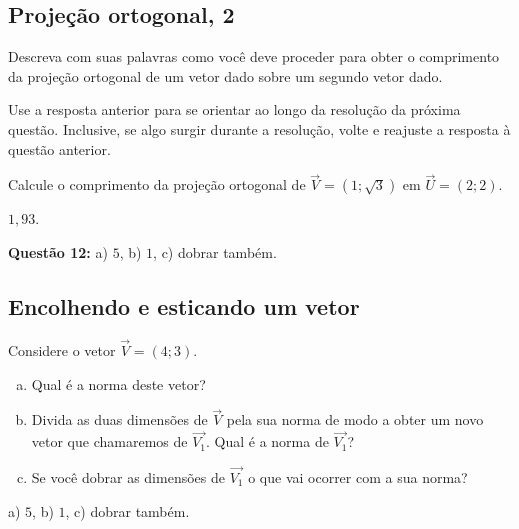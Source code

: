 \documentclass[main.tex]{subfiles}
\begin{document}
\subsection*{Projeção ortogonal, 2}

\begin{reflita}
 Descreva com suas palavras como você deve proceder para obter o comprimento da projeção ortogonal de um vetor dado sobre um segundo vetor dado.
\end{reflita}

Use a resposta anterior para se orientar ao longo da resolução da próxima questão. Inclusive, se algo surgir durante a resolução, volte e reajuste a resposta à questão anterior.

\begin{questao}
\item Calcule o comprimento da projeção ortogonal de $\overrightarrow{V}=(1;\sqrt{3})$ em $\overrightarrow{U}=(2;2)$.
\end{questao}

\begin{gabarito}
	\begin{gabaritoQuestao}
		$1,93$.

\noindent\textbf{Questão 12:} a) $5$, b) $1$, c) dobrar também.
	\end{gabaritoQuestao}
\end{gabarito}


\subsection*{Encolhendo e esticando um vetor}

\begin{questao}
Considere o vetor $\overrightarrow{V}=(4;3)$.
\begin{enumerate}[a)]
\item Qual é a norma deste vetor?
\item Divida as duas dimensões de $\overrightarrow{V}$ pela sua norma de modo a obter um novo vetor que chamaremos de $\overrightarrow{V_1}$. Qual é a norma de $\overrightarrow{V_1}$?
\item Se você dobrar as dimensões de $\overrightarrow{V_1}$ o que vai ocorrer com a sua norma?
\end{enumerate}
\end{questao}

\begin{gabarito}
	\begin{gabaritoQuestao}
		a) $5$, b) $1$, c) dobrar também.
	\end{gabaritoQuestao}
\end{gabarito}
\end{document}
